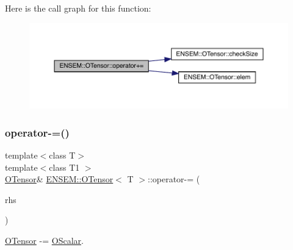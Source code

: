 Here is the call graph for this function\+:
\nopagebreak
\begin{figure}[H]
\begin{center}
\leavevmode
\includegraphics[width=350pt]{da/d8a/classENSEM_1_1OTensor_a621ebf0d6d94eb56c1e3b31cb8c933b1_cgraph}
\end{center}
\end{figure}
\mbox{\label{classENSEM_1_1OTensor_a61ebd11eac882623ea080293b007972b}} 
\subsubsection{\texorpdfstring{operator-\/=()}{operator-=()}\hspace{0.1cm}{\footnotesize\ttfamily [1/6]}}
{\footnotesize\ttfamily template$<$class T$>$ \\
template$<$class T1 $>$ \\
\mbox{\hyperlink{classENSEM_1_1OTensor}{O\+Tensor}}\& \mbox{\hyperlink{classENSEM_1_1OTensor}{E\+N\+S\+E\+M\+::\+O\+Tensor}}$<$ T $>$\+::operator-\/= (\begin{DoxyParamCaption}\item[{const \mbox{\hyperlink{classENSEM_1_1OScalar}{O\+Scalar}}$<$ T1 $>$ \&}]{rhs }\end{DoxyParamCaption})\hspace{0.3cm}{\ttfamily [inline]}}



\mbox{\hyperlink{classENSEM_1_1OTensor}{O\+Tensor}} -\/= \mbox{\hyperlink{classENSEM_1_1OScalar}{O\+Scalar}}. 

